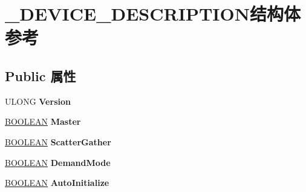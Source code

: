 \hypertarget{struct___d_e_v_i_c_e___d_e_s_c_r_i_p_t_i_o_n}{}\section{\+\_\+\+D\+E\+V\+I\+C\+E\+\_\+\+D\+E\+S\+C\+R\+I\+P\+T\+I\+O\+N结构体 参考}
\label{struct___d_e_v_i_c_e___d_e_s_c_r_i_p_t_i_o_n}
\subsection*{Public 属性}
\begin{DoxyCompactItemize}
\item 
\mbox{\label{struct___d_e_v_i_c_e___d_e_s_c_r_i_p_t_i_o_n_a8aaafc6b8091fea63ee85c4ab58cc3f7}} 
U\+L\+O\+NG {\bfseries Version}
\item 
\mbox{\label{struct___d_e_v_i_c_e___d_e_s_c_r_i_p_t_i_o_n_af69e8bfeec21bd73388e9200a13b66fe}} 
\hyperlink{_processor_bind_8h_a112e3146cb38b6ee95e64d85842e380a}{B\+O\+O\+L\+E\+AN} {\bfseries Master}
\item 
\mbox{\label{struct___d_e_v_i_c_e___d_e_s_c_r_i_p_t_i_o_n_aa14b11db47aefa352dfc42cfcba60495}} 
\hyperlink{_processor_bind_8h_a112e3146cb38b6ee95e64d85842e380a}{B\+O\+O\+L\+E\+AN} {\bfseries Scatter\+Gather}
\item 
\mbox{\label{struct___d_e_v_i_c_e___d_e_s_c_r_i_p_t_i_o_n_af6609454311c2060ddd27a97ac0fca65}} 
\hyperlink{_processor_bind_8h_a112e3146cb38b6ee95e64d85842e380a}{B\+O\+O\+L\+E\+AN} {\bfseries Demand\+Mode}
\item 
\mbox{\label{struct___d_e_v_i_c_e___d_e_s_c_r_i_p_t_i_o_n_aa17d8adbc156385a1e7505e44d078968}} 
\hyperlink{_processor_bind_8h_a112e3146cb38b6ee95e64d85842e380a}{B\+O\+O\+L\+E\+AN} {\bfseries Auto\+Initialize}
\item 
\mbox{\label{struct___d_e_v_i_c_e___d_e_s_c_r_i_p_t_i_o_n_af21e4a0a1344f972897fc1c44847f914}} 

\end{DoxyCompactItemize}
